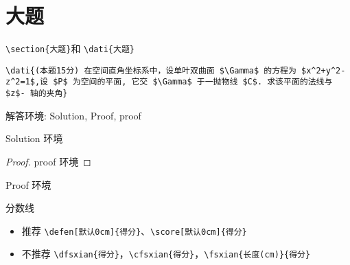 \documentclass[11pt,twoside]{article} %
\begin{document}
\section{大题}
\lstinline[style = iltx]|\section{大题}|和
\lstinline[style=iltx]|\dati{大题}|
\begin{lstlisting}[style=tsdtex]
\dati{(本题15分) 在空间直角坐标系中，设单叶双曲面 $\Gamma$ 的方程为 $x^2+y^2-z^2=1$,设 $P$ 为空间的平面, 它交 $\Gamma$ 于一抛物线 $C$. 求该平面的法线与 $z$- 轴的夹角}
\end{lstlisting}
\vspace{1ex}

\vspace{2.5ex}
\noindent 解答环境: Solution, Proof, proof
\begin{Solution}
Solution 环境
\end{Solution}

\begin{proof}
proof 环境
\end{proof}

\begin{Proof}
Proof 环境
\end{Proof}

\vspace{1.5em}
\noindent 分数线
\begin{itemize}
\item 推荐 \lstinline[style=iltx]|\defen[默认0cm]{得分}|、\lstinline[style=iltx]|\score[默认0cm]{得分}|
\item 不推荐 \lstinline[style=iltx]|\dfsxian{得分}|，\lstinline[style=iltx]|\cfsxian{得分}|，\lstinline[style=iltx]|\fsxian{长度(cm)}{得分}|
\end{itemize}
\end{document}
